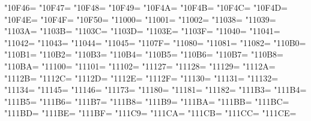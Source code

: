 \XeTeXcharclass"10F46=\KclassCM
\XeTeXcharclass"10F47=\KclassCM
\XeTeXcharclass"10F48=\KclassCM
\XeTeXcharclass"10F49=\KclassCM
\XeTeXcharclass"10F4A=\KclassCM
\XeTeXcharclass"10F4B=\KclassCM
\XeTeXcharclass"10F4C=\KclassCM
\XeTeXcharclass"10F4D=\KclassCM
\XeTeXcharclass"10F4E=\KclassCM
\XeTeXcharclass"10F4F=\KclassCM
\XeTeXcharclass"10F50=\KclassCM
\XeTeXcharclass"11000=\KclassCM
\XeTeXcharclass"11001=\KclassCM
\XeTeXcharclass"11002=\KclassCM
\XeTeXcharclass"11038=\KclassCM
\XeTeXcharclass"11039=\KclassCM
\XeTeXcharclass"1103A=\KclassCM
\XeTeXcharclass"1103B=\KclassCM
\XeTeXcharclass"1103C=\KclassCM
\XeTeXcharclass"1103D=\KclassCM
\XeTeXcharclass"1103E=\KclassCM
\XeTeXcharclass"1103F=\KclassCM
\XeTeXcharclass"11040=\KclassCM
\XeTeXcharclass"11041=\KclassCM
\XeTeXcharclass"11042=\KclassCM
\XeTeXcharclass"11043=\KclassCM
\XeTeXcharclass"11044=\KclassCM
\XeTeXcharclass"11045=\KclassCM
\XeTeXcharclass"1107F=\KclassCM
\XeTeXcharclass"11080=\KclassCM
\XeTeXcharclass"11081=\KclassCM
\XeTeXcharclass"11082=\KclassCM
\XeTeXcharclass"110B0=\KclassCM
\XeTeXcharclass"110B1=\KclassCM
\XeTeXcharclass"110B2=\KclassCM
\XeTeXcharclass"110B3=\KclassCM
\XeTeXcharclass"110B4=\KclassCM
\XeTeXcharclass"110B5=\KclassCM
\XeTeXcharclass"110B6=\KclassCM
\XeTeXcharclass"110B7=\KclassCM
\XeTeXcharclass"110B8=\KclassCM
\XeTeXcharclass"110BA=\KclassCM
\XeTeXcharclass"11100=\KclassCM
\XeTeXcharclass"11101=\KclassCM
\XeTeXcharclass"11102=\KclassCM
\XeTeXcharclass"11127=\KclassCM
\XeTeXcharclass"11128=\KclassCM
\XeTeXcharclass"11129=\KclassCM
\XeTeXcharclass"1112A=\KclassCM
\XeTeXcharclass"1112B=\KclassCM
\XeTeXcharclass"1112C=\KclassCM
\XeTeXcharclass"1112D=\KclassCM
\XeTeXcharclass"1112E=\KclassCM
\XeTeXcharclass"1112F=\KclassCM
\XeTeXcharclass"11130=\KclassCM
\XeTeXcharclass"11131=\KclassCM
\XeTeXcharclass"11132=\KclassCM
\XeTeXcharclass"11134=\KclassCM
\XeTeXcharclass"11145=\KclassCM
\XeTeXcharclass"11146=\KclassCM
\XeTeXcharclass"11173=\KclassCM
\XeTeXcharclass"11180=\KclassCM
\XeTeXcharclass"11181=\KclassCM
\XeTeXcharclass"11182=\KclassCM
\XeTeXcharclass"111B3=\KclassCM
\XeTeXcharclass"111B4=\KclassCM
\XeTeXcharclass"111B5=\KclassCM
\XeTeXcharclass"111B6=\KclassCM
\XeTeXcharclass"111B7=\KclassCM
\XeTeXcharclass"111B8=\KclassCM
\XeTeXcharclass"111B9=\KclassCM
\XeTeXcharclass"111BA=\KclassCM
\XeTeXcharclass"111BB=\KclassCM
\XeTeXcharclass"111BC=\KclassCM
\XeTeXcharclass"111BD=\KclassCM
\XeTeXcharclass"111BE=\KclassCM
\XeTeXcharclass"111BF=\KclassCM
\XeTeXcharclass"111C9=\KclassCM
\XeTeXcharclass"111CA=\KclassCM
\XeTeXcharclass"111CB=\KclassCM
\XeTeXcharclass"111CC=\KclassCM
\XeTeXcharclass"111CE=\KclassCM
